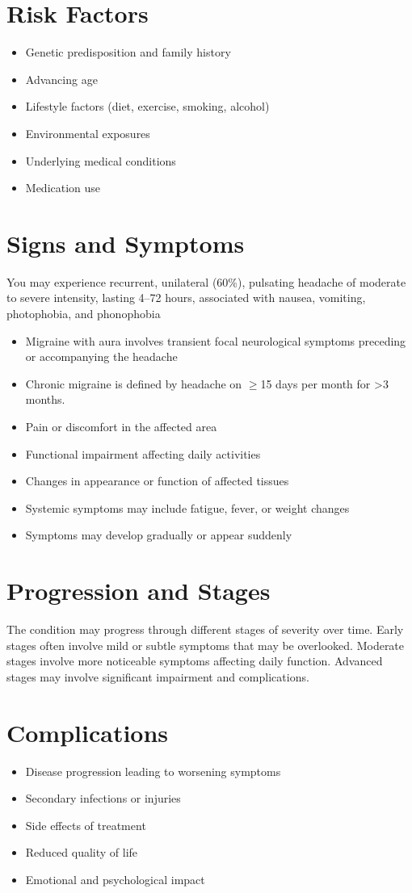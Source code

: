 \section{Risk Factors}
\begin{itemize}[noitemsep]
  \item Genetic predisposition and family history
  \item Advancing age
  \item Lifestyle factors (diet, exercise, smoking, alcohol)
  \item Environmental exposures
  \item Underlying medical conditions
  \item Medication use
\end{itemize}
\section{Signs and Symptoms}
You may experience recurrent, unilateral (60\%), pulsating headache of moderate to severe intensity, lasting 4--72 hours, associated with nausea, vomiting, photophobia, and phonophobia

\begin{itemize}[noitemsep]
  \item Migraine with aura involves transient focal neurological symptoms preceding or accompanying the headache
  \item Chronic migraine is defined by headache on $\ge$15 days per month for >3 months.
  \item Pain or discomfort in the affected area
  \item Functional impairment affecting daily activities
  \item Changes in appearance or function of affected tissues
  \item Systemic symptoms may include fatigue, fever, or weight changes
  \item Symptoms may develop gradually or appear suddenly
\end{itemize}
\section{Progression and Stages}
The condition may progress through different stages of severity over time. Early stages often involve mild or subtle symptoms that may be overlooked. Moderate stages involve more noticeable symptoms affecting daily function. Advanced stages may involve significant impairment and complications.
\section{Complications}
\begin{itemize}[noitemsep]
  \item Disease progression leading to worsening symptoms
  \item Secondary infections or injuries
  \item Side effects of treatment
  \item Reduced quality of life
  \item Emotional and psychological impact
\end{itemize}
